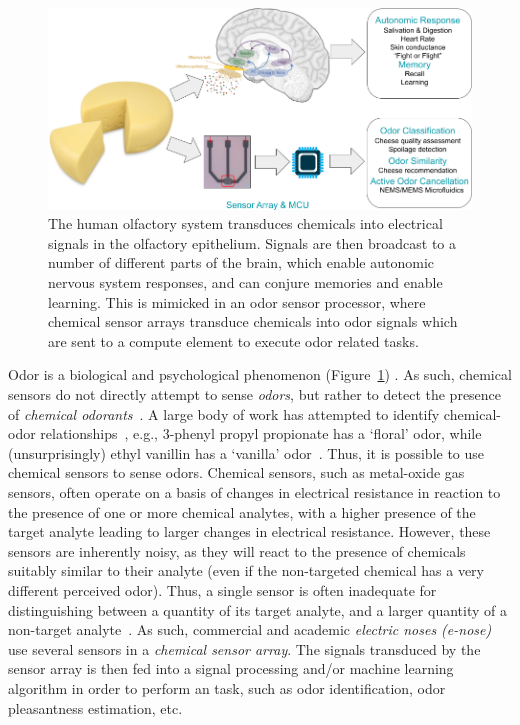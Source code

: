

\begin{figure}
    \includegraphics[width=\linewidth]{man_vs_machine.png}
    \caption{\small
        The human olfactory system transduces chemicals into electrical signals
        in the olfactory epithelium. Signals are then broadcast to a number of
        different parts of the brain, which enable autonomic nervous system
        responses, and can conjure memories and enable learning. This is
        mimicked in an odor sensor processor, where chemical sensor arrays
        transduce chemicals into odor signals which are sent to a compute
        element to execute odor related tasks.
    }
    \label{fig:man_vs_machine}
\end{figure}


Odor is a biological and psychological phenomenon (Figure~\ref{fig:man_vs_machine}) .  As such, chemical sensors
do not directly attempt to sense \textit{odors}, but rather to detect the
presence of \textit{chemical odorants}~\cite{dravnieks1985atlas,
snitz2019smellspace, keller2017predicting, malnic1999combinatorial}. A large
body of work has attempted to identify chemical-odor
relationships~\cite{snitz2019smellspace, keller2017predicting,
zhou2018hyperbolic, koulakov2011search, mamlouk2004dimensions}, e.g., 3-phenyl
propyl propionate has a `floral' odor, while (unsurprisingly) ethyl vanillin
has a `vanilla' odor~\cite{the_good_scents_company_2021}.  Thus, it is possible
to use chemical sensors to sense odors. Chemical sensors, such as metal-oxide
gas sensors, often operate on a basis of changes in electrical resistance in
reaction to the presence of one or more chemical analytes, with a higher
presence of the target analyte leading to larger changes in electrical
resistance.  However, these sensors are inherently noisy, as they will react to
the presence of chemicals suitably similar to their analyte (even if the
non-targeted chemical has a very different perceived odor).  Thus, a single
sensor is often inadequate for distinguishing between a quantity of its target
analyte, and a larger quantity of a non-target
analyte~\cite{schroeder2018carbon}. As such, commercial and academic
\textit{electric noses (e-nose)} use several sensors in a \textit{chemical
sensor array}.  The signals transduced by the sensor array is then fed into a
signal processing and/or machine learning algorithm in order to perform an
\olfc{} task, such as odor identification, odor pleasantness estimation, etc.

